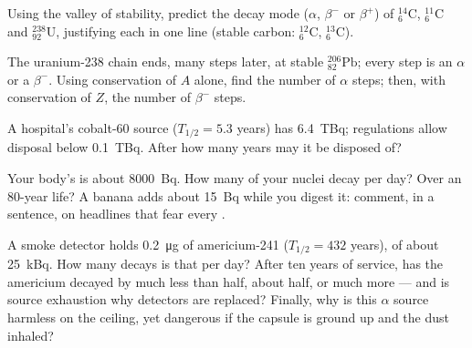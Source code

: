 \begin{exercise}[$\star\star$]\label{exo:g11:nucleus-radioactivity:11}
Using the valley of stability, predict the decay mode ($\alpha$, $\beta^-$ or
$\beta^+$) of ${}^{14}_{6}\mathrm{C}$, ${}^{11}_{6}\mathrm{C}$ and
${}^{238}_{92}\mathrm{U}$, justifying each in one line (stable carbon:
${}^{12}_{6}\mathrm{C}$, ${}^{13}_{6}\mathrm{C}$).
\end{exercise}

\begin{exercise}[$\star\star\star$]\label{exo:g11:nucleus-radioactivity:12}
The uranium-238 chain ends, many steps later, at stable
${}^{206}_{82}\mathrm{Pb}$; every step is an $\alpha$ or a $\beta^-$. Using
conservation of $A$ alone, find the number of $\alpha$ steps; then, with
conservation of $Z$, the number of $\beta^-$ steps.
\end{exercise}

\begin{exercise}[$\star\star\star$]\label{exo:g11:nucleus-radioactivity:13}
A hospital's cobalt-60 source ($T_{1/2} = 5.3$ years) has 
\qty{6.4}{TBq}; regulations allow disposal below \qty{0.1}{TBq}. After how
many years may it be disposed of?
\end{exercise}

\begin{exercise}[$\star\star\star$]\label{exo:g11:nucleus-radioactivity:14}
Your body's  is about \qty{8000}{Bq}. How many of your nuclei decay
per day? Over an $80$-year life? A banana adds about \qty{15}{Bq} while you
digest it: comment, in a sentence, on headlines that fear every .
\end{exercise}

\begin{exercise}[$\star\star\star$]\label{exo:g11:nucleus-radioactivity:15}
A smoke detector holds \qty{0.2}{\micro\gram} of americium-241
($T_{1/2} = 432$ years), of  about \qty{25}{kBq}. How many decays is
that per day? After ten years of service, has the americium decayed by much
less than half, about half, or much more --- and is source exhaustion why
detectors are replaced? Finally, why is this $\alpha$ source harmless on the
ceiling, yet dangerous if the capsule is ground up and the dust inhaled?
\end{exercise}

